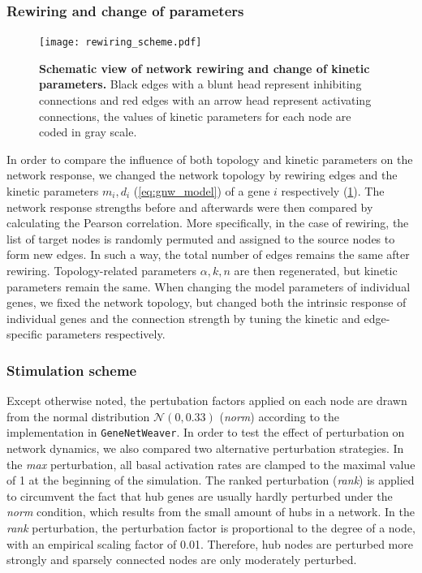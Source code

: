 
\subsubsection{Rewiring and change of parameters}

\begin{figure}[!ht]
\begin{center}
\texttt{[image: rewiring\_scheme.pdf]}
\end{center}
\caption[Schematic view of network rewiring and kinetic parameter change]{
{\bf Schematic view of network rewiring and change of kinetic parameters.} 
Black edges with a blunt head represent inhibiting
connections and red edges with an arrow head represent activating
connections, the values of kinetic parameters for each node are 
coded in gray scale. 
}
\label{fig:rewiring_scheme}
\end{figure}

In order to compare the influence of both topology and 
kinetic parameters on 
the network response, we changed the network topology by rewiring edges and 
the kinetic parameters $m_i, d_i$ (\ref{eq:gnw_model}) of a gene $i$ 
respectively (\ref{fig:rewiring_scheme}). The
network response strengths before and afterwards were then compared by
calculating the Pearson correlation. More specifically, in the case of 
rewiring, the list of target nodes is randomly permuted and assigned to the
source nodes to form new edges. 
In such a way, the total number of edges
remains the same after rewiring. 
Topology-related parameters $\alpha, k, n$ are
then regenerated, but kinetic parameters remain the same. 
When changing the model parameters of individual genes, we fixed the network
topology, but changed both the intrinsic response of individual genes and 
the connection strength by tuning the kinetic and 
edge-specific parameters 
respectively.

\subsubsection{Stimulation scheme}
Except otherwise noted, the pertubation factors applied on 
each node are drawn from the normal distribution 
$\mathcal{N}(0,0.33)$ (\emph{norm}) according to the 
implementation in \texttt{GeneNetWeaver}. In order to test the 
effect of perturbation on network dynamics, we also compared 
two alternative
perturbation strategies. In the \emph{max} perturbation, all basal activation
rates are clamped to the maximal value of 1 at the beginning of the
simulation. The ranked perturbation (\emph{rank}) is applied
to circumvent the fact that hub genes are usually hardly 
perturbed under the \emph{norm} condition, which results from
the small amount of hubs in a network. In the \emph{rank}
perturbation, the
perturbation factor is proportional to the degree of a node, with an empirical scaling 
factor of 0.01. Therefore, hub nodes are perturbed more strongly and 
sparsely connected nodes are only moderately perturbed.

